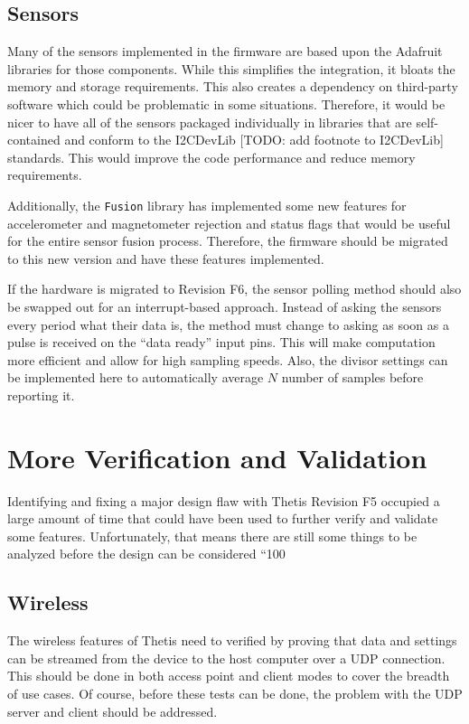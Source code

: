 \subsection{Sensors}
Many of the sensors implemented in the firmware are based upon the Adafruit libraries for those components.
While this simplifies the integration, it bloats the memory and storage requirements.
This also creates a dependency on third-party software which could be problematic in some situations.
Therefore, it would be nicer to have all of the sensors packaged individually in libraries that are self-contained and conform to the I2CDevLib [TODO: add footnote to I2CDevLib] standards.
This would improve the code performance and reduce memory requirements.

Additionally, the \lstinline[style=customInline]|Fusion| library has implemented some new features for accelerometer and magnetometer rejection and status flags that would be useful for the entire sensor fusion process.
Therefore, the firmware should be migrated to this new version and have these features implemented.

If the hardware is migrated to Revision F6, the sensor polling method should also be swapped out for an interrupt-based approach.
Instead of asking the sensors every period what their data is, the method must change to asking as soon as a pulse is received on the ``data ready'' input pins.
This will make computation more efficient and allow for high sampling speeds.
Also, the divisor settings can be implemented here to automatically average $N$ number of samples before reporting it.

\section{More Verification and Validation}
Identifying and fixing a major design flaw with Thetis Revision F5 occupied a large amount of time that could have been used to further verify and validate some features.
Unfortunately, that means there are still some things to be analyzed before the design can be considered ``100%

\subsection{Wireless}
The wireless features of Thetis need to verified by proving that data and settings can be streamed from the device to the host computer over a UDP connection.
This should be done in both access point and client modes to cover the breadth of use cases.
Of course, before these tests can be done, the problem with the UDP server and client should be addressed.

